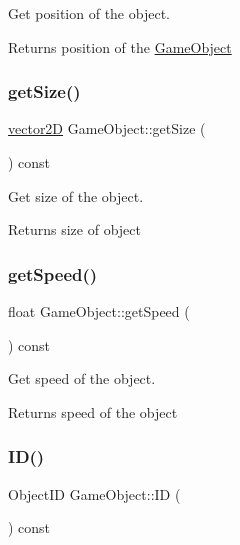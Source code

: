 Get position of the object. 

\begin{DoxyReturn}{Returns}
position of the \mbox{\hyperlink{class_game_object}{Game\+Object}} 
\end{DoxyReturn}
\mbox{\label{class_game_object_a2df595e48b25e0377757471f75d89e15}} 
\subsubsection{\texorpdfstring{get\+Size()}{getSize()}}
{\footnotesize\ttfamily \mbox{\hyperlink{classvector2_d}{vector2D}} Game\+Object\+::get\+Size (\begin{DoxyParamCaption}{ }\end{DoxyParamCaption}) const\hspace{0.3cm}{\ttfamily [inline]}}



Get size of the object. 

\begin{DoxyReturn}{Returns}
size of object 
\end{DoxyReturn}
\mbox{\label{class_game_object_a70800bd43cf0b786bf6d0f172072b682}} 
\subsubsection{\texorpdfstring{get\+Speed()}{getSpeed()}}
{\footnotesize\ttfamily float Game\+Object\+::get\+Speed (\begin{DoxyParamCaption}{ }\end{DoxyParamCaption}) const\hspace{0.3cm}{\ttfamily [inline]}}



Get speed of the object. 

\begin{DoxyReturn}{Returns}
speed of the object 
\end{DoxyReturn}
\mbox{\label{class_game_object_a0c8139d67c763ff80cd384000b908a36}} 
\subsubsection{\texorpdfstring{I\+D()}{ID()}}
{\footnotesize\ttfamily Object\+ID Game\+Object\+::\+ID (\begin{DoxyParamCaption}{ }\end{DoxyParamCaption}) const\hspace{0.3cm}{\ttfamily [inline]}}



